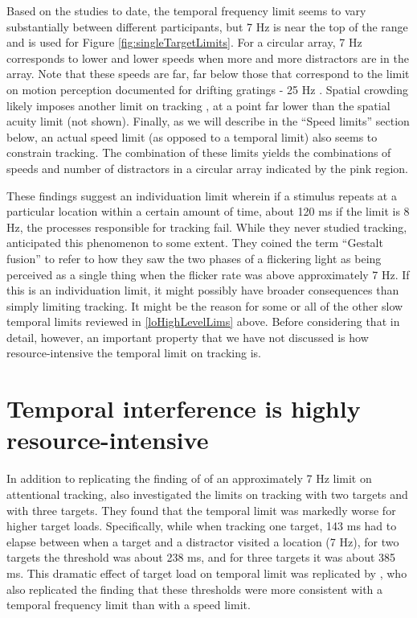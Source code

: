 \documentclass[
]{book}
\begin{document}
Based on the studies to date, the temporal frequency limit seems to vary substantially between different participants, but 7 Hz is near the top of the range and is used for Figure \ref{fig:singleTargetLimits}. For a circular array, 7 Hz corresponds to lower and lower speeds when more and more distractors are in the array. Note that these speeds are far, far below those that correspond to the limit on motion perception documented for drifting gratings - 25 Hz \citep{burrContrastSensitivityHigh1982}. Spatial crowding likely imposes another limit on tracking \citep{holcombeObjectTrackingAbsence2014, intriligatorSpatialResolutionVisual2001}, at a point far lower than the spatial acuity limit (not shown). Finally, as we will describe in the ``Speed limits'' section below, an actual speed limit (as opposed to a temporal limit) also seems to constrain tracking. The combination of these limits yields the combinations of speeds and number of distractors in a circular array indicated by the pink region.

These findings suggest an individuation limit wherein if a stimulus repeats at a particular location within a certain amount of time, about 120 ms if the limit is 8 Hz, the processes responsible for tracking fail. While they never studied tracking, \citet{vandegrindTemporalTransferProperties1973} anticipated this phenomenon to some extent. They coined the term ``Gestalt fusion'' to refer to how they saw the two phases of a flickering light as being perceived as a single thing when the flicker rate was above approximately 7 Hz. If this is an individuation limit, it might possibly have broader consequences than simply limiting tracking. It might be the reason for some or all of the other slow temporal limits reviewed in \ref{loHighLevelLims} above. Before considering that in detail, however, an important property that we have not discussed is how resource-intensive the temporal limit on tracking is.

\hypertarget{temporal-interference-is-highly-resource-intensive}{%
\section{Temporal interference is highly resource-intensive}\label{temporal-interference-is-highly-resource-intensive}}

In addition to replicating the finding of \citet{verstratenLimitsAttentiveTracking2000} of an approximately 7 Hz limit on attentional tracking, \citet{holcombeSplittingAttentionReduces2013} also investigated the limits on tracking with two targets and with three targets. They found that the temporal limit was markedly worse for higher target loads. Specifically, while when tracking one target, 143 ms had to elapse between when a target and a distractor visited a location (7 Hz), for two targets the threshold was about 238 ms, and for three targets it was about 385 ms. This dramatic effect of target load on temporal limit was replicated by \citet{roudaiaDifferentEffectsAging2017}, who also replicated the finding that these thresholds were more consistent with a temporal frequency limit than with a speed limit.
\end{document}
